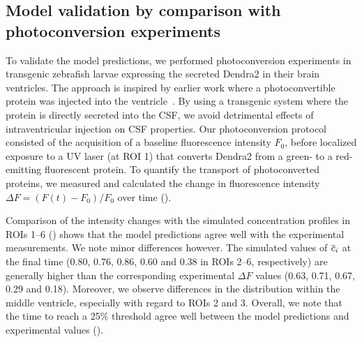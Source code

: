 \documentclass{WileyMSP-template}
\begin{document}
\subsection{Model validation by comparison with photoconversion experiments}

To validate the model predictions, we performed photoconversion
experiments in transgenic zebrafish larvae expressing the secreted
Dendra2 in their brain ventricles. The approach is inspired by earlier work
where a photoconvertible protein was injected into the ventricle~\cite{fame2016directional}.
By using a transgenic system where the protein is directly secreted into the CSF,
we avoid detrimental effects of intraventricular injection on CSF properties. 
Our photoconversion protocol
consisted of the acquisition of a baseline fluorescence intensity
$F_0$, before localized exposure to a UV laser (at ROI 1) that
converts Dendra2 from a green- to a red-emitting fluorescent
protein. To quantify the transport of photoconverted proteins, we
measured and calculated the change in fluorescence intensity $\Delta F
= (F(t)-F_0)/F_0$ over time ().

Comparison of the intensity changes with the simulated concentration
profiles in ROIs 1--6 () shows that the
model predictions agree well with the experimental measurements. We
note minor differences however. The simulated values of $\overline{c}_i$ at
the final time (0.80, 0.76, 0.86, 0.60 and 0.38 in ROIs 2--6, respectively)
are generally higher than the corresponding experimental $\Delta F$
values (0.63, 0.71, 0.67, 0.29 and 0.18). Moreover, we observe
differences in the distribution within the middle ventricle,
especially with regard to ROIs 2 and 3. Overall, we note that the time
to reach a 25\% threshold agree well between the model predictions and
experimental values ().
\end{document}
